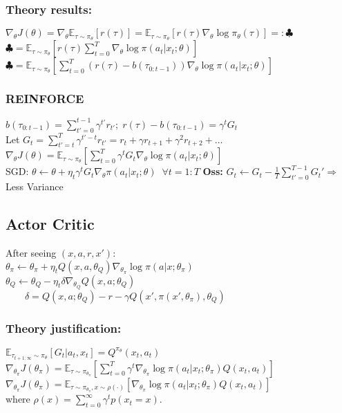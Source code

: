 \subsubsection{Theory results:}
{\scriptsize $\nabla_\theta J(\theta) = \nabla_\theta \mathbb{E}_{\tau \sim \pi_\theta}\left[r(\tau)\right]=\mathbb{E}_{\tau \sim \pi_\theta}\left[r(\tau)\nabla_\theta \log{\pi_\theta(\tau)}\right] =: \clubsuit $}\\
{ $ \clubsuit = \mathbb{E}_{\tau\sim\pi_\theta}\left[r(\tau)\sum_{t=0}^T \nabla_\theta \log\pi(a_t\vert x_t;\theta )\right]$}\\
{$ \clubsuit = \mathbb{E}_{\tau \sim \pi_\theta}\left[\sum\limits_{t=0}^T(r(\tau)-b(\tau_{0:t-1})) \nabla_\theta \log\pi(a_t\vert x_t;\theta )\right] $}

\subsubsection{REINFORCE}
$b(\tau_{0:t-1}) = \sum_{t'=0}^{t-1}\gamma^{t'}r_{t'};\; r(\tau) - b(\tau_{0:t-1}) = \gamma^t G_t$ \\
Let $G_t = \sum_{t'=t}^{T}\gamma^{t'-t}r_{t'} = r_t + \gamma r_{t+1} + \gamma^2 r_{t+2} + \dots$ \\
$\nabla_\theta J(\theta) = \mathbb{E}_{\tau \sim \pi_\theta}\left[\sum_{t=0}^T\gamma^t G_t\nabla_\theta \log\pi(a_t\vert x_t;\theta )\right]  $\\
SGD:  $\theta \gets \theta + \eta_t \gamma^tG_t \nabla_\theta \pi(a_t\vert x_t; \theta)\;\; \forall t = 1:T$ 
\textbf{Oss:} $G_t \gets G_t - \frac{1}{T}\sum_{t'=0}^{T-1} G_t' \Rightarrow$ Less Variance


\subsection{Actor Critic}
After seeing $(x,a,r,x')$: \\
$\theta_\pi \gets \theta_\pi + \eta_t Q(x,a,\theta_Q)\nabla_{\theta_\pi}\log \pi(a\vert x; \theta_\pi)$\\
$\theta_Q \gets \theta_Q - \eta_t\delta \nabla_{\theta_Q}Q(x,a;\theta_Q)$\\
$\qquad \delta = Q(x,a;\theta_Q)-r-\gamma Q(x',\pi(x',\theta_\pi),\theta_Q)$

\subsubsection{Theory justification:}
$\mathbb{E}_{\tau_{t+1:\infty}\sim \pi_\theta}\left[G_t \vert a_t,x_t\right] = Q^{\pi_\theta}(x_t, a_t)$\\
{\scriptsize $\nabla_{\theta_\pi} J(\theta_\pi)= \mathbb{E}_{\tau \sim \pi_{\theta_\pi}}\left[\sum_{t=0}^T\gamma^t \nabla_{\theta_\pi} \log\pi(a_t\vert x_t;\theta_\pi ) Q(x_t,a_t)\right] $}\\
{\scriptsize $\nabla_{\theta_\pi} J(\theta_\pi)= \mathbb{E}_{\tau \sim \pi_{\theta_\pi},x\sim \rho(\cdot)}\left[\nabla_{\theta_\pi} \log\pi(a_t\vert x_t;\theta_\pi ) Q(x_t,a_t)\right] $}\\
where $\rho(x) = \sum_{t=0}^\infty \gamma^t p(x_t=x)$.


